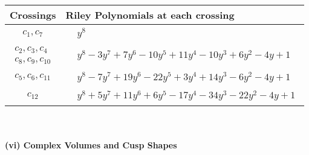 \documentclass[1p]{elsarticle_modified}
\theoremstyle{definition}
\begin{document}
\begin{tabular}{m{50pt}|m{274pt}}
Crossings & \hspace{64pt}Riley Polynomials at each crossing \\
\hline $$\begin{aligned}c_{1},c_{7}\end{aligned}$$&$\begin{aligned}
&y^8
\end{aligned}$\\
\hline $$\begin{aligned}c_{2},c_{3},c_{4}\\c_{8},c_{9},c_{10}\end{aligned}$$&$\begin{aligned}
&y^8-3 y^7+7 y^6-10 y^5+11 y^4-10 y^3+6 y^2-4 y+1
\end{aligned}$\\
\hline $$\begin{aligned}c_{5},c_{6},c_{11}\end{aligned}$$&$\begin{aligned}
&y^8-7 y^7+19 y^6-22 y^5+3 y^4+14 y^3-6 y^2-4 y+1
\end{aligned}$\\
\hline $$\begin{aligned}c_{12}\end{aligned}$$&$\begin{aligned}
&y^8+5 y^7+11 y^6+6 y^5-17 y^4-34 y^3-22 y^2-4 y+1
\end{aligned}$\\
\hline
\end{tabular}\\~\\
\newpage\flushleft \textbf{(vi) Complex Volumes and Cusp Shapes}
\end{document}
